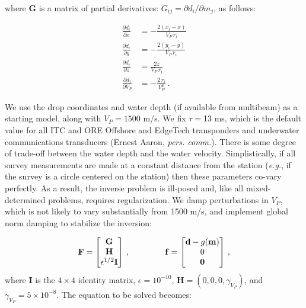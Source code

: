 where $\mathbf{G}$ is a matrix of partial derivatives: $G_{ij} = \partial d_i/\partial m_j$, as follows:

\begin{align}
\frac{\partial d_i}{\partial x} &= 
	-\frac{2 (x_i - x)}{V_P \, r_i}\\
\frac{\partial d_i}{\partial y} &= 
	-\frac{2 (y_i - y)}{V_P \, r_i} \\
\frac{\partial d_i}{\partial z} &= 
	\frac{2 z}{V_P \, r_i} \\	
\frac{\partial d_i}{\partial V_P} &= 
	-\frac{2 \, r_i}{V_P^2} \,.
\end{align}

We use the drop coordinates and water depth (if available from multibeam) as a starting model, along with $V_P = 1500$ m/s. We fix $\tau =$13 ms, which is the default value for all ITC and ORE Offshore and EdgeTech transponders and underwater communications transducers (Ernest Aaron, \textit{pers. comm.}). There is some degree of trade-off between the water depth and the water velocity. Simplistically, if all survey measurements are made at a constant distance from the station (\textit{e.g.}, if the survey is a circle centered on the station) then these parameters co-vary perfectly. As a result, the inverse problem is ill-posed and, like all mixed-determined problems, requires regularization. We damp perturbations in $V_P$, which is not likely to vary substantially from 1500 m/s, and implement global norm damping to stabilize the inversion:

\begin{equation}
	\mathbf{F} = 
	\left[\begin{matrix}
	\mathbf{G}\\\mathbf{H}\\\epsilon^{1/2}\mathbf{I}
	\end{matrix}\right] \,,
	\hspace{15mm}
	\mathbf{f} = 
	\left[\begin{matrix}
	\mathbf{d} - g(\mathbf{m})\\0\\\mathbf{0}
	\end{matrix}\right] \,,
\end{equation}
where $\mathbf{I}$ is the $4\times 4$ identity matrix, $\epsilon = 10^{-10}$, $\mathbf{H}=\left( 0, 0, 0, \gamma_{V_P} \right)$, and $\gamma_{V_P} = 5\times10^{-8}$. The equation to be solved becomes:

